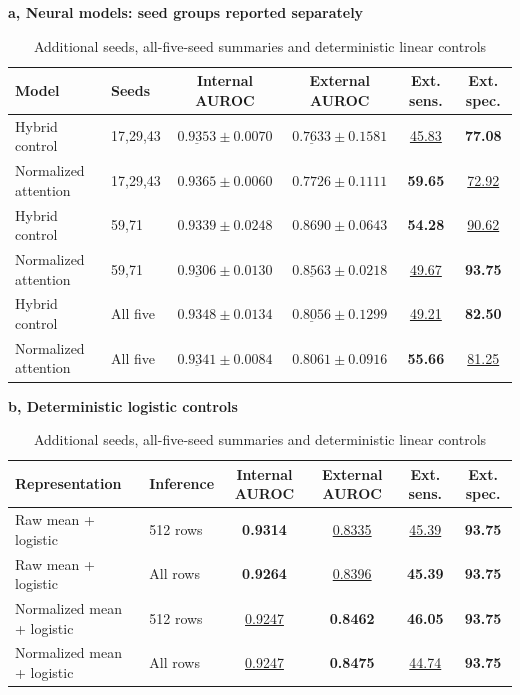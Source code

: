\clearpage
\begin{table}[H]\centering
\caption{Additional seeds, all-five-seed summaries and deterministic linear controls}\label{tab:S17}
\small
\textbf{a, Neural models: seed groups reported separately}\par\smallskip
\begin{tabularx}{\textwidth}{@{}>{\raggedright\arraybackslash}Xlcccc@{}}
\toprule
Model & Seeds & Internal AUROC & External AUROC & Ext. sens. & Ext. spec. \\
\midrule
Hybrid control & 17,29,43 & $\underline{0.9353}\pm0.0070$ & $\underline{0.7633}\pm0.1581$ & \underline{45.83} & \textbf{77.08} \\
Normalized attention & 17,29,43 & $\mathbf{0.9365}\pm0.0060$ & $\mathbf{0.7726}\pm0.1111$ & \textbf{59.65} & \underline{72.92} \\
Hybrid control & 59,71 & $\mathbf{0.9339}\pm0.0248$ & $\mathbf{0.8690}\pm0.0643$ & \textbf{54.28} & \underline{90.62} \\
Normalized attention & 59,71 & $\underline{0.9306}\pm0.0130$ & $\underline{0.8563}\pm0.0218$ & \underline{49.67} & \textbf{93.75} \\
Hybrid control & All five & $\mathbf{0.9348}\pm0.0134$ & $\underline{0.8056}\pm0.1299$ & \underline{49.21} & \textbf{82.50} \\
Normalized attention & All five & $\underline{0.9341}\pm0.0084$ & $\mathbf{0.8061}\pm0.0916$ & \textbf{55.66} & \underline{81.25} \\
\bottomrule
\end{tabularx}
\par\medskip
\textbf{b, Deterministic logistic controls}\par\smallskip
\begin{tabularx}{\textwidth}{@{}>{\raggedright\arraybackslash}Xlcccc@{}}
\toprule
Representation & Inference & Internal AUROC & External AUROC & Ext. sens. & Ext. spec. \\
\midrule
Raw mean + logistic & 512 rows & \textbf{0.9314} & \underline{0.8335} & \underline{45.39} & \textbf{93.75} \\
Raw mean + logistic & All rows & \textbf{0.9264} & \underline{0.8396} & \textbf{45.39} & \textbf{93.75} \\
Normalized mean + logistic & 512 rows & \underline{0.9247} & \textbf{0.8462} & \textbf{46.05} & \textbf{93.75} \\
Normalized mean + logistic & All rows & \underline{0.9247} & \textbf{0.8475} & \underline{44.74} & \textbf{93.75} \\

\end{tabularx}
\end{table}
